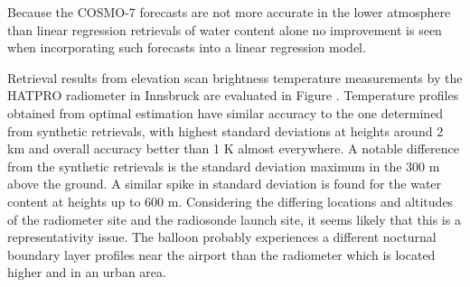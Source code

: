     Because the COSMO-7 forecasts are not more accurate in the lower atmosphere
    than linear regression retrievals of water content alone no improvement
    is seen when incorporating such forecasts into a linear regression model.

        {}

\stopsubsection

\startsubsection[title={Retrievals with Real Radiometer Data},reference=ch:hatproeval]

    Retrieval results from elevation scan brightness temperature measurements
    by the HATPRO radiometer in Innsbruck are evaluated in Figure
    . Temperature profiles obtained from optimal estimation
    have similar accuracy to the one determined from synthetic retrievals, with
    highest standard deviations at heights around 2 km and overall accuracy
    better than 1 K almost everywhere. A notable difference from the synthetic
    retrievals is the standard deviation maximum in the 300 m above the ground.
    A similar spike in standard deviation is found for the water content at
    heights up to 600 m. Considering the differing locations and altitudes of
    the radiometer site and the radiosonde launch site, it seems likely that
    this is a representativity issue. The balloon probably experiences
    a different nocturnal boundary layer profiles near the airport than the
    radiometer which is located higher and in an urban area.

